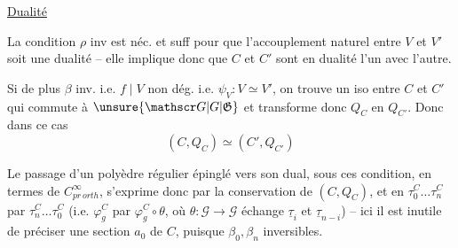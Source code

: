 \uline{Dualité} 

La condition $\rho$ inv est néc. et suff pour que l'accouplement naturel entre $V$ et $V'$ soit une dualité -- elle implique donc que $C$ et $C'$ sont en dualité l'un avec l'autre.

Si de plus $\beta$ inv. i.e.  $f\mid V$ non dég. i.e. $\psi_V:V\simeq V'$, on trouve un iso entre  $C$ et $C'$ qui commute à $\unsure{\mathscr G|G|\mathfrak G}$ et transforme donc $Q_C$ en $Q_{C'}$. Donc dans ce cas
\[
(C,Q_C)\simeq(C',Q_{C'})
\]

Le passage d'un polyèdre régulier  épinglé vers son dual, sous ces condition, en termes de $C^\infty_{pr\,orth}$, s'exprime donc par la conservation de $(C,Q_C)$, et en   $\tau_0^C\ldots\tau_n^C$ par $\tau_n^C\ldots\tau_0^C$ (i.e. $\varphi_g^C$ par $\varphi_g^C\circ\theta$, où $\theta:\mathscr G\longrightarrow\mathscr G$ échange $\underline\tau_i$ et $\underline\tau_{n-i}$) -- ici il est inutile de préciser une section $a_0$  de $C$,  puisque $\beta_0,\beta_n$ inversibles.


